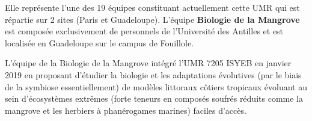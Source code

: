     \vspace{0.5cm}

    Elle représente l'une des 19 équipes constituant actuellement cette UMR qui est répartie sur 2 sites (Paris et Guadeloupe). L'équipe \textbf{Biologie de la Mangrove} est composée exclusivement de personnels de l'Université des Antilles et est localisée en Guadeloupe sur le campus de Fouillole.

    \vspace{0.5cm}
    
    L'équipe de la Biologie de la Mangrove intégré l'UMR 7205 ISYEB en janvier 2019 en proposant d'étudier la biologie et les adaptations évolutives (par le biais de la symbiose essentiellement) de modèles littoraux côtiers tropicaux évoluant au sein d'écosystèmes extrêmes (forte teneurs en composés soufrés réduits comme la mangrove et les herbiers à phanérogames marines) faciles d'accès.